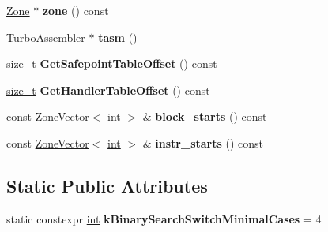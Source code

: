 \begin{DoxyCompactItemize}
\mbox{\hyperlink{classv8_1_1internal_1_1Zone}{Zone}} $\ast$ {\bfseries zone} () const
\item 
\mbox{\label{classv8_1_1internal_1_1compiler_1_1CodeGenerator_aa7ad5d377fb772f8b1a82ce2b84413d4}} 
\mbox{\hyperlink{classv8_1_1internal_1_1TurboAssembler}{Turbo\+Assembler}} $\ast$ {\bfseries tasm} ()
\item 
\mbox{\label{classv8_1_1internal_1_1compiler_1_1CodeGenerator_ac3515e8223d54c6a5afba21ff75ce7bd}} 
\mbox{\hyperlink{classsize__t}{size\+\_\+t}} {\bfseries Get\+Safepoint\+Table\+Offset} () const
\item 
\mbox{\label{classv8_1_1internal_1_1compiler_1_1CodeGenerator_ac49679c60efb4d21dd8b7bd258b8f2cc}} 
\mbox{\hyperlink{classsize__t}{size\+\_\+t}} {\bfseries Get\+Handler\+Table\+Offset} () const
\item 
\mbox{\label{classv8_1_1internal_1_1compiler_1_1CodeGenerator_ac78132fa902aa718ed02ae5e8899a23e}} 
const \mbox{\hyperlink{classv8_1_1internal_1_1ZoneVector}{Zone\+Vector}}$<$ \mbox{\hyperlink{classint}{int}} $>$ \& {\bfseries block\+\_\+starts} () const
\item 
\mbox{\label{classv8_1_1internal_1_1compiler_1_1CodeGenerator_ae60547be8aed32eae047718ba78cd4f5}} 
const \mbox{\hyperlink{classv8_1_1internal_1_1ZoneVector}{Zone\+Vector}}$<$ \mbox{\hyperlink{classint}{int}} $>$ \& {\bfseries instr\+\_\+starts} () const
\end{DoxyCompactItemize}
\subsection*{Static Public Attributes}
\begin{DoxyCompactItemize}
\item 
\mbox{\label{classv8_1_1internal_1_1compiler_1_1CodeGenerator_a27e295454098050a93845e8e8f917663}} 
static constexpr \mbox{\hyperlink{classint}{int}} {\bfseries k\+Binary\+Search\+Switch\+Minimal\+Cases} = 4
\end{DoxyCompactItemize}
